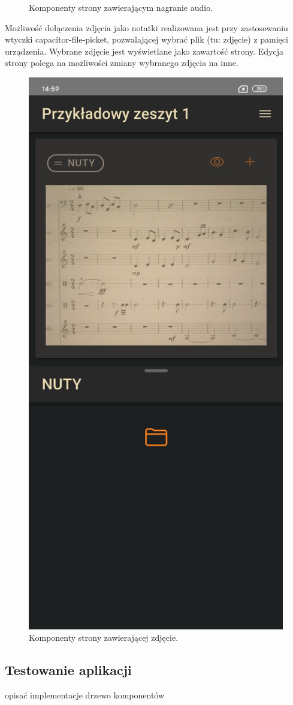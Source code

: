 \begin{figure}[H]
\begin{center}
	\end{center}
	\caption{Komponenty strony zawierającym nagranie audio.}
	\label{rys:audio-page}
\end{figure}

Możliwość dołączenia zdjęcia jako notatki realizowana jest przy zastosowaniu wtyczki capacitor-file-picket,
pozwalającej wybrać plik (tu: zdjęcie) z pamięci urządzenia. Wybrane zdjęcie jest wyświetlane jako zawartość strony.
Edycja strony polega na możliwości zmiany wybranego zdjęcia na inne.
\begin{figure}[H]
	\begin{center}
		\includegraphics[scale=0.2]{media/PhotoPage.jpg}
	\end{center}
	\caption{Komponenty strony zawierającej zdjęcie.}
	\label{rys:photo-page}
\end{figure}

\subsection{Testowanie aplikacji}

opisać implementacje
drzewo komponentów
